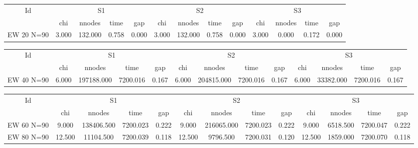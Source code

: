 \begin{sidewaystable}[h] \begin{tabular}{|c|cccc|cccc|cccc|}
\hline
\multicolumn{1}{|c|}{Id} & \multicolumn{4}{|c|}{S1} & \multicolumn{4}{|c|}{S2} & \multicolumn{4}{|c|}{S3}
\\
 & chi & nnodes & time & gap & chi & nnodes & time & gap & chi & nnodes & time & gap
\\
\hline
EW 20 N=90 & 3.000 & 132.000 & 0.758 & 0.000 & 3.000 & 132.000 & 0.758 & 0.000 & 3.000 & 0.000 & 0.172 & 0.000
\\
\hline 
 \end{tabular}

 \begin{tabular}{|c|cccc|cccc|cccc|}
\hline
\multicolumn{1}{|c|}{Id} & \multicolumn{4}{|c|}{S1} & \multicolumn{4}{|c|}{S2} & \multicolumn{4}{|c|}{S3}
\\
 & chi & nnodes & time & gap & chi & nnodes & time & gap & chi & nnodes & time & gap
\\
\hline
EW 40 N=90 & 6.000 & 197188.000 & 7200.016 & 0.167 & 6.000 & 204815.000 & 7200.016 & 0.167 & 6.000 & 33382.000 & 7200.016 & 0.167
\\
\hline 
 \end{tabular} 

 \begin{tabular}{|c|cccc|cccc|cccc|}
\hline
\multicolumn{1}{|c|}{Id} & \multicolumn{4}{|c|}{S1} & \multicolumn{4}{|c|}{S2} & \multicolumn{4}{|c|}{S3}
\\
 & chi & nnodes & time & gap & chi & nnodes & time & gap & chi & nnodes & time & gap
\\
\hline
EW 60 N=90 & 9.000 & 138406.500 & 7200.023 & 0.222 & 9.000 & 216065.000 & 7200.023 & 0.222 & 9.000 & 6518.500 & 7200.047 & 0.222
\\
EW 80 N=90 & 12.500 & 11104.500 & 7200.039 & 0.118 & 12.500 & 9796.500 & 7200.031 & 0.120 & 12.500 & 1859.000 & 7200.070 & 0.118
\\
\hline 
 \end{tabular} \end{sidewaystable}


